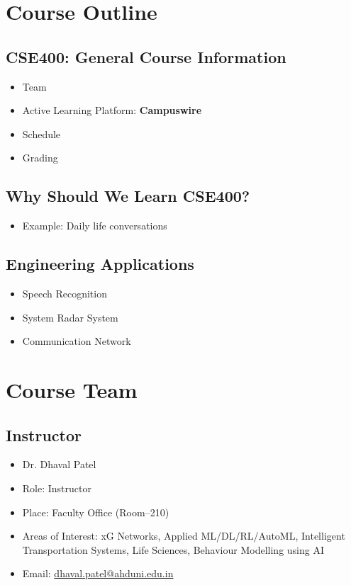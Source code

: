 \documentclass[11pt]{article}
\begin{document}
\section{Course Outline}

\subsection{CSE400: General Course Information}
\begin{itemize}
    \item Team
    \item Active Learning Platform: \textbf{Campuswire}
    \item Schedule
    \item Grading
\end{itemize}

\subsection{Why Should We Learn CSE400?}
\begin{itemize}
    \item Example: Daily life conversations
\end{itemize}

\subsection{Engineering Applications}
\begin{itemize}
    \item Speech Recognition
    \item System Radar System
    \item Communication Network
\end{itemize}

\section{Course Team}

\subsection*{Instructor}
\begin{itemize}
    \item Dr. Dhaval Patel
    \item Role: Instructor
    \item Place: Faculty Office (Room--210)
    \item Areas of Interest: xG Networks, Applied ML/DL/RL/AutoML, Intelligent Transportation Systems, Life Sciences, Behaviour Modelling using AI
    \item Email: \href{mailto:dhaval.patel@ahduni.edu.in}{dhaval.patel@ahduni.edu.in}
\end{itemize}
\end{document}
